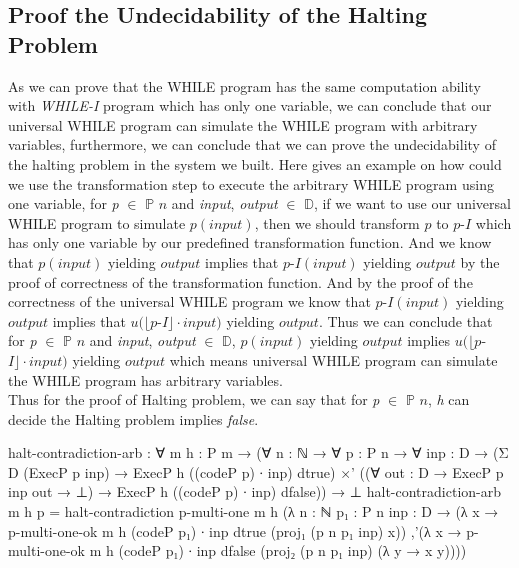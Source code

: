 \documentclass{jfrarticle}
\newcommand{\md}[1]{$\mathds{#1}$}
\begin{document}
\subsection{Proof the Undecidability of the Halting Problem}
As we can prove that the WHILE program has the same computation ability with \textit{WHILE-I} program which has only one variable,
we can conclude that our universal WHILE program can simulate the WHILE program with arbitrary variables, 
furthermore, we can conclude that we can prove the undecidability of the halting problem in the system we built.
Here gives an example on how could we use the transformation step to execute the arbitrary WHILE program using one variable, 
for \textit{p} $\in$ \md{P} $n$ and \textit{input}, \textit{output} $\in$ \md{D}, if we want to use our universal WHILE program to simulate $p(input)$,
then we should transform $p$ to $p$-$I$ which has only one variable by our predefined transformation function.
And we know that $p(input)$ yielding $output$ implies that $p$-$I(input)$ yielding $output$ by the proof of correctness of the transformation function.
And by the proof of the correctness of the universal WHILE program we know that $p$-$I(input)$ yielding $output$ implies that $u(\lfloor p$-$I\rfloor \cdot input)$ yielding $output$.
Thus we can conclude that for \textit{p} $\in$ \md{P} $n$ and \textit{input}, \textit{output} $\in$ \md{D}, $p(input)$ yielding $output$ implies $u(\lfloor p$-$I\rfloor \cdot input)$ yielding $output$ which means universal WHILE program can simulate the WHILE program has arbitrary variables.\\
Thus for the proof of Halting problem, we can say that for \textit{p} $\in$ \md{P} $n$, \textit{h} can decide the Halting problem implies \textit{false}.
\begin{code}[fontsize=\small]
halt-contradiction-arb : ∀ {m} {h : P m}
                   → (∀ {n : ℕ} → ∀ {p : P n} → ∀ {inp : D}
                      → (Σ D (ExecP p inp) → ExecP h ((codeP p) ∙ inp) dtrue)
                      ×' ((∀ {out : D} → ExecP p inp out → ⊥)
                          → ExecP h ((codeP p) ∙ inp) dfalse))
                   → ⊥
halt-contradiction-arb {m} {h} p = halt-contradiction {p-multi-one {m} h}
                                   (λ {n : ℕ} {p₁ : P n} {inp : D}
                                   → (λ x → p-multi-one-ok {m} {h}
                                                           {(codeP p₁) ∙ inp}
                                                           {dtrue}
                                                           (proj₁ (p {n} {p₁} {inp}) x))
                                   ,'(λ x → p-multi-one-ok {m} {h}
                                                           {(codeP p₁) ∙ inp}
                                                           {dfalse}
                                                           (proj₂ (p {n} {p₁} {inp})
                                                                  (λ y → x y))))
\end{code}
\end{document}
